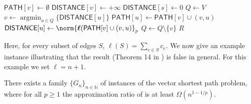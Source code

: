 \documentclass[11pt,a4paper]{article}
\begin{document}
\begin{algorithm}[H]
\caption{$\ell_p$-Dijkstra$(G,d,s,t,p)$~\cite{bilo2017simple}}\label{alg:dijkstra}
\begin{algorithmic}[1]
    \State $\mathsf{PATH}[v] \gets \emptyset$
    \State $\mathsf{DISTANCE}[v] \gets +\infty$
\EndFor
\State $\mathsf{DISTANCE}[s] \gets 0$
\State $Q \gets V$
    \State $v \gets \operatorname{argmin}_{u\in Q}\{\mathsf{DISTANCE}[u]\}$
    \State $\mathsf{PATH}[u]\gets \mathsf{PATH}[v] \cup (v,u)$
    \State $\mathsf{DISTANCE}[u]\gets\norm{\boldsymbol{\ell} (\mathsf{PATH}[v] 
    \cup (v,u) }_p$
    \EndIf
    \EndFor
    \State $Q \gets Q\setminus \{v\}$
\EndWhile
\State \Return $R$
\end{algorithmic}
\end{algorithm}

Here, for every subset of edges $S$, $\boldsymbol{\ell}(S) = \sum_{e\in S} c_e$.
%
We now give an example instance illustrating that the result (Theorem 14 in \cite{bilo2017simple}) is false in general. For this example we set $\ell = n + 1$. 

\begin{proposition}\label{prop:unbounded-approx-ration}
    There exists a family $\{G_n\}_{n\in \mathbb{N}}$ of instances of the vector shortest path problem, where for all \(p \ge 1\) the approximation ratio of  is at least \(\Omega(n^{1-1/p})\).
\end{proposition}
\end{document}
